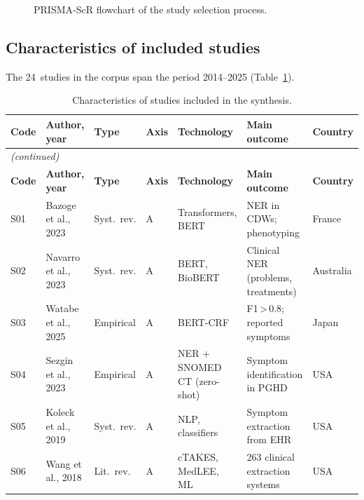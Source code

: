 \documentclass[review,12pt]{elsarticle}
\begin{document}
\begin{figure}[h]
  \centering
  \resizebox{\linewidth}{!}{}
  \caption{PRISMA-ScR flowchart of the study selection process.}
  \label{fig:prisma}
\end{figure}

\subsection{Characteristics of included studies}

The 24~studies in the corpus span the period 2014--2025
(Table~\ref{tab:estudos}).

\begin{longtable}{p{0.65cm} p{2.4cm} p{1.55cm} p{0.55cm} p{2.2cm} p{2.35cm} p{1.4cm}}
\caption{Characteristics of studies included in the synthesis.}
\label{tab:estudos}\\
\toprule
\textbf{Code} & \textbf{Author, year} & \textbf{Type} &
\textbf{Axis} & \textbf{Technology} & \textbf{Main outcome} & \textbf{Country} \\
\midrule
\endfirsthead
\multicolumn{7}{l}{\small\textit{(continued)}}\\
\toprule
\textbf{Code} & \textbf{Author, year} & \textbf{Type} &
\textbf{Axis} & \textbf{Technology} & \textbf{Main outcome} & \textbf{Country} \\
\midrule
\endhead
\bottomrule
\endfoot
S01 & Bazoge et al., 2023    & Syst.\ rev.  & A & Transformers, BERT         & NER in CDWs; phenotyping               & France        \\
S02 & Navarro et al., 2023   & Syst.\ rev.  & A & BERT, BioBERT              & Clinical NER (problems, treatments)    & Australia     \\
S03 & Watabe et al., 2025    & Empirical    & A & BERT-CRF                   & F1\,>\,0.8; reported symptoms          & Japan         \\
S04 & Sezgin et al., 2023    & Empirical    & A & NER + SNOMED CT (zero-shot) & Symptom identification in PGHD        & USA           \\
S05 & Koleck et al., 2019    & Syst.\ rev.  & A & NLP, classifiers           & Symptom extraction from EHR            & USA           \\
S06 & Wang et al., 2018      & Lit.\ rev.   & A & cTAKES, MedLEE, ML         & 263 clinical extraction systems        & USA           \\

\end{longtable}
\end{document}

